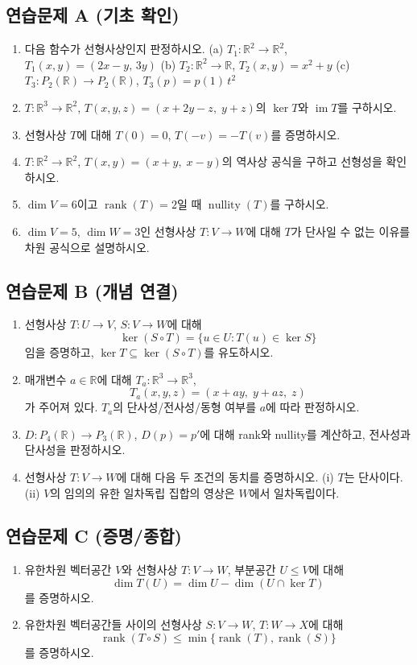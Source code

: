 \chaptersummarytemplate

\chapterexercisestemplate

\subsection*{연습문제 A (기초 확인)}
\begin{enumerate}[label=\arabic*.]
\item 다음 함수가 선형사상인지 판정하시오.  
(a) $T_1:\mathbb{R}^2\to\mathbb{R}^2$, $T_1(x,y)=(2x-y,\,3y)$  
(b) $T_2:\mathbb{R}^2\to\mathbb{R}$, $T_2(x,y)=x^2+y$  
(c) $T_3:P_2(\mathbb{R})\to P_2(\mathbb{R})$, $T_3(p)=p(1)\,t^2$
\item $T:\mathbb{R}^3\to\mathbb{R}^2$, $T(x,y,z)=(x+2y-z,\;y+z)$의 $\ker T$와 $\operatorname{im}T$를 구하시오.
\item 선형사상 $T$에 대해 $T(0)=0$, $T(-v)=-T(v)$를 증명하시오.
\item $T:\mathbb{R}^2\to\mathbb{R}^2$, $T(x,y)=(x+y,\;x-y)$의 역사상 공식을 구하고 선형성을 확인하시오.
\item $\dim V=6$이고 $\operatorname{rank}(T)=2$일 때 $\operatorname{nullity}(T)$를 구하시오.
\item $\dim V=5$, $\dim W=3$인 선형사상 $T:V\to W$에 대해 $T$가 단사일 수 없는 이유를 차원 공식으로 설명하시오.
\end{enumerate}

\subsection*{연습문제 B (개념 연결)}
\begin{enumerate}[label=\arabic*.]
\item 선형사상 $T:U\to V$, $S:V\to W$에 대해
\[
\ker(S\circ T)=\{u\in U: T(u)\in\ker S\}
\]
임을 증명하고, $\ker T\subseteq\ker(S\circ T)$를 유도하시오.
\item 매개변수 $a\in\mathbb{R}$에 대해 $T_a:\mathbb{R}^3\to\mathbb{R}^3$,
\[
T_a(x,y,z)=(x+ay,\;y+az,\;z)
\]
가 주어져 있다. $T_a$의 단사성/전사성/동형 여부를 $a$에 따라 판정하시오.
\item $D:P_4(\mathbb{R})\to P_3(\mathbb{R})$, $D(p)=p'$에 대해 rank와 nullity를 계산하고, 전사성과 단사성을 판정하시오.
\item 선형사상 $T:V\to W$에 대해 다음 두 조건의 동치를 증명하시오.  
(i) $T$는 단사이다.  
(ii) $V$의 임의의 유한 일차독립 집합의 영상은 $W$에서 일차독립이다.
\end{enumerate}

\subsection*{연습문제 C (증명/종합)}
\begin{enumerate}[label=\arabic*.]
\item 유한차원 벡터공간 $V$와 선형사상 $T:V\to W$, 부분공간 $U\le V$에 대해
\[
\dim T(U)=\dim U-\dim(U\cap\ker T)
\]
를 증명하시오.
\item 유한차원 벡터공간들 사이의 선형사상 $S:V\to W$, $T:W\to X$에 대해
\[
\operatorname{rank}(T\circ S)\le \min\{\operatorname{rank}(T),\operatorname{rank}(S)\}
\]
를 증명하시오.
\end{enumerate}